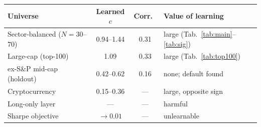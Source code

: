 \begin{tabular}{@{}lccl@{}}
\toprule
Universe & Learned $c$ & Corr.\ & Value of learning\\
\midrule
Sector-balanced ($N{=}30$--$70$) & 0.94--1.44 & 0.31 & large (Tab.~\ref{tab:main}--\ref{tab:sig})\\
Large-cap (top-100) & 1.09 & 0.33 & large (Tab.~\ref{tab:top100})\\
ex-S\&P mid-cap (holdout) & 0.42--0.62 & 0.16 & none; default found\\
Cryptocurrency & 0.15--0.36 & --- & large, opposite sign\\
Long-only layer & --- & --- & harmful\\
Sharpe objective & $\to 0.01$ & --- & unlearnable\\
\bottomrule
\end{tabular}
